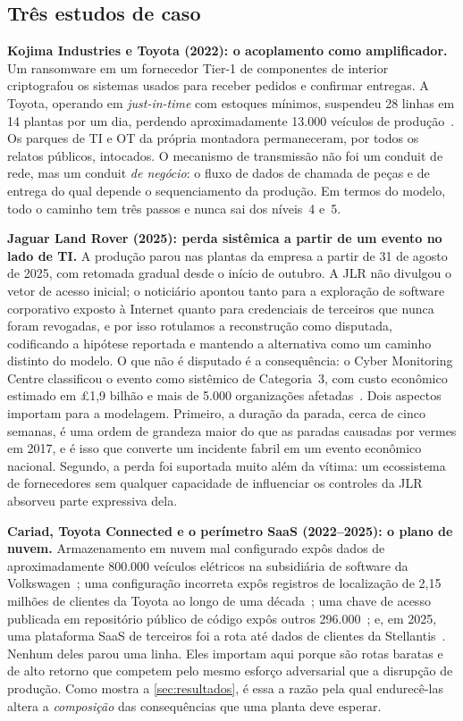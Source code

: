 

\subsection{Três estudos de caso}

\textbf{Kojima Industries e Toyota (2022): o acoplamento como amplificador.}
Um ransomware em um fornecedor Tier-1 de componentes de interior criptografou
os sistemas usados para receber pedidos e confirmar entregas. A Toyota,
operando em \emph{just-in-time} com estoques mínimos, suspendeu 28 linhas em 14
plantas por um dia, perdendo aproximadamente 13.000 veículos de
produção~\cite{inc04toyota,inc04infosec}. Os parques de TI e OT da própria
montadora permaneceram, por todos os relatos públicos, intocados. O mecanismo
de transmissão não foi um conduit de rede, mas um conduit \emph{de negócio}: o
fluxo de dados de chamada de peças e de entrega do qual depende o
sequenciamento da produção. Em termos do modelo, todo o caminho tem três passos
e nunca sai dos níveis~4 e~5.

\textbf{Jaguar Land Rover (2025): perda sistêmica a partir de um evento no lado
de TI.} A produção parou nas plantas da empresa a partir de 31 de agosto de
2025, com retomada gradual desde o início de outubro. A JLR não divulgou o
vetor de acesso inicial; o noticiário apontou tanto para a exploração de
software corporativo exposto à Internet quanto para credenciais de terceiros
que nunca foram revogadas, e por isso rotulamos a reconstrução como
\textsf{disputada}, codificando a hipótese reportada e mantendo a alternativa
como um caminho distinto do modelo. O que não é disputado é a consequência: o
Cyber Monitoring Centre classificou o evento como sistêmico de Categoria~3, com
custo econômico estimado em \pounds1,9 bilhão e mais de 5.000 organizações
afetadas~\cite{inc18cmc,inc18cw}. Dois aspectos importam para a modelagem.
Primeiro, a duração da parada, cerca de cinco semanas, é uma ordem de grandeza
maior do que as paradas causadas por vermes em 2017, e é isso que
converte um incidente fabril em um evento econômico nacional. Segundo, a perda
foi suportada muito além da vítima: um ecossistema de fornecedores sem qualquer
capacidade de influenciar os controles da JLR absorveu parte expressiva dela.

\textbf{Cariad, Toyota Connected e o perímetro SaaS (2022--2025): o plano de
nuvem.} Armazenamento em nuvem mal configurado expôs dados de aproximadamente
800.000 veículos elétricos na subsidiária de software da
Volkswagen~\cite{inc10vw}; uma configuração incorreta expôs registros de
localização de 2,15 milhões de clientes da Toyota ao longo de uma
década~\cite{inc09toyotacloud}; uma chave de acesso publicada em repositório
público de código expôs outros 296.000~\cite{inc19toyotagithub}; e, em 2025,
uma plataforma SaaS de terceiros foi a rota até dados de clientes da
Stellantis~\cite{inc17stellantis}. Nenhum deles parou uma linha. Eles importam
aqui porque são rotas baratas e de alto retorno que competem pelo mesmo esforço
adversarial que a disrupção de produção. Como mostra a \cref{sec:resultados}, é essa a
razão pela qual endurecê-las altera a \emph{composição} das consequências que
uma planta deve esperar.

